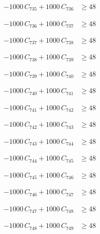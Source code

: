 \documentclass[a4paper,11pt]{article}
\begin{document}
\begin{align}
-1000\,C_{735} + 1000\,C_{736} &\geq 48 \nonumber
\end{align}

\begin{align}
-1000\,C_{736} + 1000\,C_{737} &\geq 48 \nonumber
\end{align}

\begin{align}
-1000\,C_{737} + 1000\,C_{738} &\geq 48 \nonumber
\end{align}

\begin{align}
-1000\,C_{738} + 1000\,C_{739} &\geq 48 \nonumber
\end{align}

\begin{align}
-1000\,C_{739} + 1000\,C_{740} &\geq 48 \nonumber
\end{align}

\begin{align}
-1000\,C_{740} + 1000\,C_{741} &\geq 48 \nonumber
\end{align}

\begin{align}
-1000\,C_{741} + 1000\,C_{742} &\geq 48 \nonumber
\end{align}

\begin{align}
-1000\,C_{742} + 1000\,C_{743} &\geq 48 \nonumber
\end{align}

\begin{align}
-1000\,C_{743} + 1000\,C_{744} &\geq 48 \nonumber
\end{align}

\begin{align}
-1000\,C_{744} + 1000\,C_{745} &\geq 48 \nonumber
\end{align}

\begin{align}
-1000\,C_{745} + 1000\,C_{746} &\geq 48 \nonumber
\end{align}

\begin{align}
-1000\,C_{746} + 1000\,C_{747} &\geq 48 \nonumber
\end{align}

\begin{align}
-1000\,C_{747} + 1000\,C_{748} &\geq 48 \nonumber
\end{align}

\begin{align}
-1000\,C_{748} + 1000\,C_{749} &\geq 48 \nonumber
\end{align}
\end{document}

